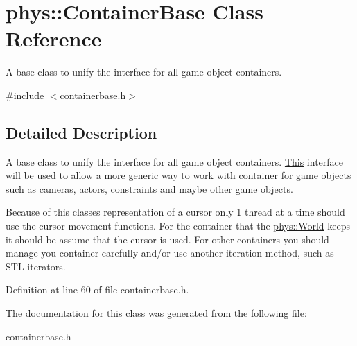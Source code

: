 \hypertarget{classphys_1_1ContainerBase}{
\section{phys::ContainerBase Class Reference}
\label{d5/d8b/classphys_1_1ContainerBase}
}


A base class to unify the interface for all game object containers.  




{\ttfamily \#include $<$containerbase.h$>$}



\subsection{Detailed Description}
A base class to unify the interface for all game object containers. \hyperlink{structThis}{This} interface will be used to allow a more generic way to work with container for game objects such as cameras, actors, constraints and maybe other game objects. \par
\par
 Because of this classes representation of a cursor only 1 thread at a time should use the cursor movement functions. For the container that the \hyperlink{classphys_1_1World}{phys::World} keeps it should be assume that the cursor is used. For other containers you should manage you container carefully and/or use another iteration method, such as STL iterators. 

Definition at line 60 of file containerbase.h.



The documentation for this class was generated from the following file:\begin{DoxyCompactItemize}
\item 
containerbase.h\end{DoxyCompactItemize}
